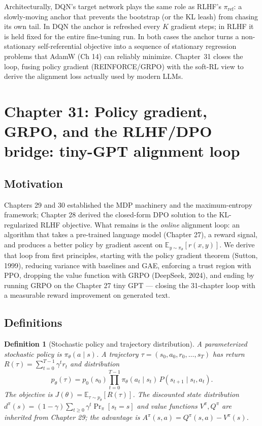 \documentclass[11pt]{article}
\newtheorem{definition}[theorem]{Definition}
\theoremstyle{remark}
\begin{document}
Architecturally, DQN's target network plays the same role as RLHF's $\pi_{\mathrm{ref}}$: a slowly-moving anchor that prevents the bootstrap (or the KL leash) from chasing its own tail. In DQN the anchor is refreshed every $K$ gradient steps; in RLHF it is held fixed for the entire fine-tuning run. In both cases the anchor turns a non-stationary self-referential objective into a sequence of stationary regression problems that AdamW (Ch 14) can reliably minimize. Chapter~31 closes the loop, fusing policy gradient (REINFORCE/GRPO) with the soft-RL view to derive the alignment loss actually used by modern LLMs.


\section*{Chapter 31: Policy gradient, GRPO, and the RLHF/DPO bridge: tiny-GPT alignment loop}

\subsection*{Motivation}

Chapters 29 and 30 established the MDP machinery and the maximum-entropy framework; Chapter 28 derived the closed-form DPO solution to the KL-regularized RLHF objective. What remains is the \emph{online} alignment loop: an algorithm that takes a pre-trained language model (Chapter 27), a reward signal, and produces a better policy by gradient ascent on $\mathbb{E}_{y\sim\pi_\theta}[r(x,y)]$. We derive that loop from first principles, starting with the policy gradient theorem (Sutton, 1999), reducing variance with baselines and GAE, enforcing a trust region with PPO, dropping the value function with GRPO (DeepSeek, 2024), and ending by running GRPO on the Chapter 27 tiny GPT — closing the 31-chapter loop with a measurable reward improvement on generated text.

\subsection*{Definitions}

\begin{definition}[Stochastic policy and trajectory distribution]
A parameterized stochastic policy is $\pi_\theta(a\mid s)$. A trajectory $\tau=(s_0,a_0,r_0,\ldots,s_T)$ has return $R(\tau)=\sum_{t=0}^{T-1}\gamma^t r_t$ and distribution
\[
p_\theta(\tau)=p_0(s_0)\prod_{t=0}^{T-1}\pi_\theta(a_t\mid s_t)\,P(s_{t+1}\mid s_t,a_t).
\]
The objective is $J(\theta)=\mathbb{E}_{\tau\sim p_\theta}[R(\tau)]$. The discounted state distribution $d^\pi(s)=(1-\gamma)\sum_{t\geq 0}\gamma^t \Pr_\pi[s_t=s]$ and value functions $V^\pi,Q^\pi$ are inherited from Chapter 29; the advantage is $A^\pi(s,a)=Q^\pi(s,a)-V^\pi(s)$.
\end{definition}
\end{document}
